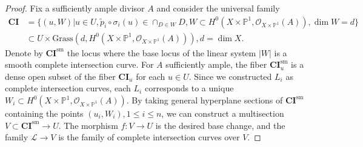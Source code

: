 \documentclass{amsart}
\theoremstyle{definition}
\theoremstyle{remark}
\newcommand{\mbb}{\mathbb}
\newcommand{\PP}{\mbb{P}}
\newcommand{\mc}{\mathcal}
\newcommand{\OO}{\mc{O}}
\begin{document}
\begin{proof}
Fix a sufficiently ample divisor $A$ and consider the universal family 
    \begin{align*}
        \textbf{CI}&=\{(u, W)|u \in U, \tilde{p}_i\circ \sigma_i(u)\in \cap_{D \in W}D, W\subset {H^0(X\times \PP^1, \OO_{X\times \PP^1}(A))}, \dim W=d \}\\
        &\subset U \times \text{Grass}(d, H^0(X\times \PP^1, \OO_{X\times \PP^1}(A))), d=\dim X.
    \end{align*}
    Denote by $\textbf{CI}^{\text{sm}}$ the locus where the base locus of the linear system $|W|$ is a smooth complete intersection curve.
    For $A$ sufficiently ample, the fiber $\textbf{CI}^{\text{sm}}_u$ is a dense open subset of the fiber $\textbf{CI}_u$ for each $u\in U$.
  Since we constructed $L_i$ as complete intersection curves, each $L_i$ corresponds to a unique $W_i\subset {H^0(X\times \PP^1, \OO_{X\times \PP^1}(A))}$.
    By taking general hyperplane sections of $\textbf{CI}^{\text{sm}}$ containing the points $(u_i, W_i), 1\leq i \leq n$, we can construct a multisection $V\subset \textbf{CI}^{\text{sm}}\to U$. The morphism $f:V\to U$ is the desired base change, and the family $\mathcal{L}\to V$ is the family of complete intersection curves over $V$.
\end{proof}
\end{document}

